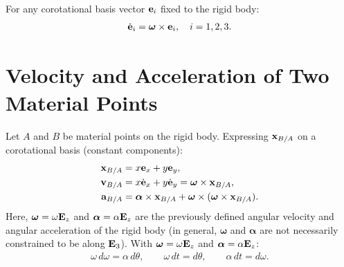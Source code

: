 \documentclass[
  letterpaper,
  DIV=11,
  numbers=noendperiod]{scrreprt}
\newcommand{\bomega}{\boldsymbol{\omega}}
\newcommand{\balpha}{\boldsymbol{\alpha}}
\begin{document}
\begin{tcolorbox}[enhanced jigsaw, arc=.35mm, bottomrule=.15mm, bottomtitle=1mm, breakable, colback=white, colbacktitle=quarto-callout-important-color!10!white, colframe=quarto-callout-important-color-frame, coltitle=black, left=2mm, leftrule=.75mm, opacityback=0, opacitybacktitle=0.6, rightrule=.15mm, title=\textcolor{quarto-callout-important-color}{\faExclamation}\hspace{0.5em}{Note!}, titlerule=0mm, toprule=.15mm, toptitle=1mm]

For any corotational basis vector \({\bf e}_i\) fixed to the rigid body:
\begin{align}
    \dot{\bf e}_i = \bomega\times{\bf e}_i, \quad i=1,2,3.
\end{align}

\end{tcolorbox}

\section{Velocity and Acceleration of Two Material
Points}\label{velocity-and-acceleration-of-two-material-points}

Let \(A\) and \(B\) be material points on the rigid body. Expressing
\({\bf x}_{B/A}\) on a corotational basis (constant components):
\begin{align}
    {\bf x}_{B/A} &= x{\bf e}_x+y{\bf e}_y,\\
    {\bf v}_{B/A} &= x\dot{\bf e}_x+y\dot{\bf e}_y = \bomega\times{\bf x}_{B/A},\\
    {\bf a}_{B/A} &= \balpha\times{\bf x}_{B/A}+\bomega\times(\bomega\times{\bf x}_{B/A}).
\end{align} Here, \(\bomega = \omega{\bf E}_z\) and
\(\balpha = \alpha{\bf E}_z\) are the previously defined angular
velocity and angular acceleration of the rigid body (in general,
\(\bomega\) and \(\balpha\) are not necessarily constrained to be along
\({\bf E}_3\)). With \(\bomega = \omega{\bf E}_z\) and
\(\balpha = \alpha{\bf E}_z\): \begin{align}
    \omega\,d\omega = \alpha\,d\theta, \qquad \omega\,dt = d\theta, \qquad \alpha\,dt = d\omega.
\end{align}
\end{document}
